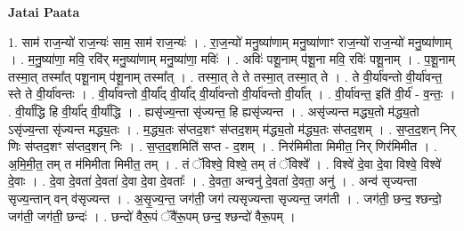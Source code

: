 \documentclass[17pt]{extarticle}
\begin{document}
\textbf{Jatai Paata} \newline

1. साम॑ राज॒न्यो॑ राज॒न्यः॑ साम॒ साम॑ राज॒न्यः॑ । . रा॒ज॒न्यो॑ मनु॒ष्या॑णाम् मनु॒ष्या॑णाꣳ राज॒न्यो॑ राज॒न्यो॑ मनु॒ष्या॑णाम् । . म॒नु॒ष्या॑णा॒ मवि॒ रवि॑र् मनु॒ष्या॑णाम् मनु॒ष्या॑णा॒ मविः॑ । . अविः॑ पशू॒नाम् प॑शू॒ना मवि॒ रविः॑ पशू॒नाम् । . प॒शू॒नाम् तस्मा॒त् तस्मा᳚त् पशू॒नाम् प॑शू॒नाम् तस्मा᳚त् । . तस्मा॒त् ते ते तस्मा॒त् तस्मा॒त् ते । . ते वी॒र्या॑वन्तो वी॒र्या॑वन्त॒ स्ते ते वी॒र्या॑वन्तः । . वी॒र्या॑वन्तो वी॒र्या᳚द् वी॒र्या᳚द् वी॒र्या॑वन्तो वी॒र्या॑वन्तो वी॒र्या᳚त् । . वी॒र्या॑वन्त॒ इति॑ वी॒र्य॑ - व॒न्तः॒ । . वी॒र्या᳚द्धि हि वी॒र्या᳚द् वी॒र्या᳚द्धि । . ह्यसृ॑ज्य॒न्ता सृ॑ज्यन्त॒ हि ह्यसृ॑ज्यन्त । . असृ॑ज्यन्त मद्ध्य॒तो म॑द्ध्य॒तो ऽसृ॑ज्य॒न्ता सृ॑ज्यन्त मद्ध्य॒तः । . म॒द्ध्य॒तः स॑प्तद॒शꣳ स॑प्तद॒शम् म॑द्ध्य॒तो म॑द्ध्य॒तः स॑प्तद॒शम् । . स॒प्त॒द॒शन् निर् णिः स॑प्तद॒शꣳ स॑प्तद॒शन् निः । . स॒प्त॒द॒शमिति॑ सप्त - द॒शम् । . निर॑मिमीता मिमीत॒ निर् णिर॑मिमीत । . अ॒मि॒मी॒त॒ तम् त म॑मिमीता मिमीत॒ तम् । . तं ॅविश्वे॒ विश्वे॒ तम् तं ॅविश्वे᳚ । . विश्वे॑ दे॒वा दे॒वा विश्वे॒ विश्वे॑ दे॒वाः । . दे॒वा दे॒वता॑ दे॒वता॑ दे॒वा दे॒वा दे॒वताः᳚ । . दे॒वता॒ अन्वनु॑ दे॒वता॑ दे॒वता॒ अनु॑ । . अन्व॑ सृज्यन्ता सृज्य॒न्तान् वन् व॑सृज्यन्त । . अ॒सृ॒ज्य॒न्त॒ जग॑ती॒ जग॑ त्यसृज्यन्ता सृज्यन्त॒ जग॑ती । . जग॑ती॒ छन्द॒ श्छन्दो॒ जग॑ती॒ जग॑ती॒ छन्दः॑ । . छन्दो॑ वैरू॒पं ॅवै॑रू॒पम् छन्द॒ श्छन्दो॑ वैरू॒पम् । \newline
\end{document}
